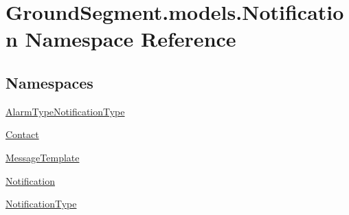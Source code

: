 \hypertarget{namespace_ground_segment_1_1models_1_1_notification}{}\section{Ground\+Segment.\+models.\+Notification Namespace Reference}
\label{namespace_ground_segment_1_1models_1_1_notification}
\subsection*{Namespaces}
\begin{DoxyCompactItemize}
\item 
 \hyperlink{namespace_ground_segment_1_1models_1_1_notification_1_1_alarm_type_notification_type}{Alarm\+Type\+Notification\+Type}
\item 
 \hyperlink{namespace_ground_segment_1_1models_1_1_notification_1_1_contact}{Contact}
\item 
 \hyperlink{namespace_ground_segment_1_1models_1_1_notification_1_1_message_template}{Message\+Template}
\item 
 \hyperlink{namespace_ground_segment_1_1models_1_1_notification_1_1_notification}{Notification}
\item 
 \hyperlink{namespace_ground_segment_1_1models_1_1_notification_1_1_notification_type}{Notification\+Type}
\end{DoxyCompactItemize}

